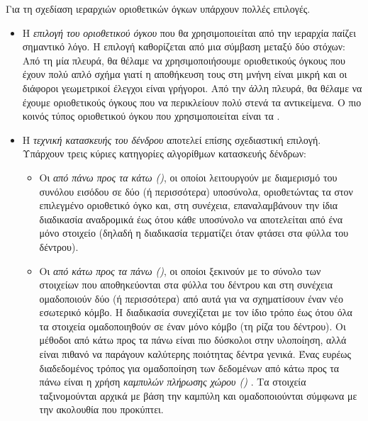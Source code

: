 Για τη σχεδίαση ιεραρχιών οριοθετικών όγκων υπάρχουν πολλές επιλογές. 
\begin{itemize}
    \item Η \textit{επιλογή του οριοθετικού όγκου} 
    που θα χρησιμοποιείται από την ιεραρχία παίζει σημαντικό λόγο. 
    Η επιλογή καθορίζεται από μια σύμβαση μεταξύ δύο στόχων: 
    Από τη μία πλευρά, θα θέλαμε να χρησιμοποιήσουμε
    οριοθετικούς όγκους που έχουν πολύ απλό σχήμα γιατί η αποθήκευση τους 
    στη μνήνη είναι μικρή και οι διάφοροι γεωμετρικοί έλεγχοι είναι 
    γρήγοροι.
    Από την άλλη πλευρά, θα θέλαμε να έχουμε οριοθετικούς όγκους που να
    περικλείουν πολύ στενά τα αντικείμενα.
    Ο πιο κοινός τύπος οριοθετικού όγκου που χρησιμοποιείται είναι τα
    .
    
    \item Η \textit{τεχνική κατασκευής του δένδρου} αποτελεί επίσης 
    σχεδιαστική επιλογή.
    Υπάρχουν τρεις κύριες κατηγορίες αλγορίθμων κατασκευής δένδρων: 
    \begin{itemize}
        \item Οι \textit{από πάνω προς τα κάτω ()}, οι 
        οποίοι λειτουργούν με διαμερισμό του συνόλου εισόδου σε δύο (ή περισσότερα)
        υποσύνολα, οριοθετώντας τα στον επιλεγμένο 
        οριοθετικό όγκο και, στη συνέχεια, επαναλαμβάνουν την ίδια 
        διαδικασία αναδρομικά έως ότου κάθε υποσύνολο να αποτελείται 
        από ένα μόνο στοιχείο (δηλαδή η διαδικασία τερματίζει 
        όταν φτάσει στα φύλλα του δέντρου).
        
        \item Οι \textit{από κάτω προς τα πάνω ()}, οι
        οποίοι ξεκινούν με το σύνολο των στοιχείων που αποθηκεύονται 
        στα φύλλα του δέντρου και στη συνέχεια ομαδοποιούν δύο (ή περισσότερα) 
        από αυτά για να σχηματίσουν έναν νέο εσωτερικό κόμβο.
        Η διαδικασία συνεχίζεται με τον ίδιο τρόπο έως ότου όλα 
        τα στοιχεία ομαδοποιηθούν σε έναν μόνο κόμβο (τη ρίζα του δέντρου).
        Οι μέθοδοι από κάτω προς τα πάνω είναι πιο δύσκολοι στην υλοποίηση, 
        αλλά είναι πιθανό να παράγουν καλύτερης ποιότητας δέντρα γενικά.
        Ένας ευρέως διαδεδομένος τρόπος για ομαδοποίηση των δεδομένων από κάτω 
        προς τα πάνω είναι η χρήση \textit{καμπυλών πλήρωσης χώρου
        ()} \cite{gu2013efficient} \cite{tero2012construct}. 
        Τα στοιχεία ταξινομούνται αρχικά με βάση την καμπύλη και 
        ομαδοποιούνται σύμφωνα με την ακολουθία που προκύπτει.
        

\end{itemize}
\end{itemize}

